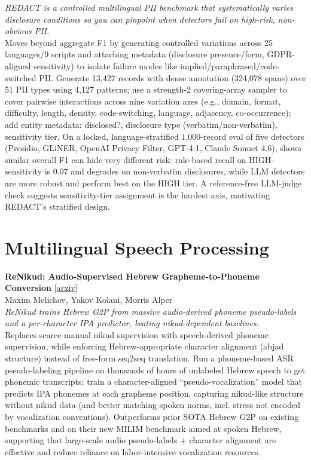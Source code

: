 \documentclass[12pt,letterpaper]{article}
\begin{document}
{\small\textit{REDACT is a controlled multilingual PII benchmark that systematically varies disclosure conditions so you can pinpoint when detectors fail on high-risk, non-obvious PII.}}\\[1pt]
{\footnotesize Moves beyond aggregate F1 by generating controlled variations across 25 languages/9 scripts and attaching metadata (disclosure presence/form, GDPR-aligned sensitivity) to isolate failure modes like implied/paraphrased/code-switched PII. Generate 13,427 records with dense annotation (324,078 spans) over 51 PII types using 4,127 patterns; use a strength-2 covering-array sampler to cover pairwise interactions across nine variation axes (e.g., domain, format, difficulty, length, density, code-switching, language, adjacency, co-occurrence); add entity metadata: disclosed?, disclosure type (verbatim/non-verbatim), sensitivity tier. On a locked, language-stratified 1,000-record eval of five detectors (Presidio, GLiNER, OpenAI Privacy Filter, GPT-4.1, Claude Sonnet 4.6), shows similar overall F1 can hide very different risk: rule-based recall on HIGH-sensitivity is 0.07 and degrades on non-verbatim disclosures, while LLM detectors are more robust and perform best on the HIGH tier. A reference-free LLM-judge check suggests sensitivity-tier assignment is the hardest axis, motivating REDACT's stratified design.}

\medskip


\section*{Multilingual Speech Processing}

{\small\textbf{ReNikud: Audio-Supervised Hebrew Grapheme-to-Phoneme Conversion}} {\scriptsize[\href{https://arxiv.org/abs/2606.20179}{arxiv}]}\\
{\scriptsize Maxim Melichov, Yakov Kolani, Morris Alper}\\

{\small\textit{ReNikud trains Hebrew G2P from massive audio-derived phoneme pseudo-labels and a per-character IPA predictor, beating nikud-dependent baselines.}}\\[1pt]
{\footnotesize Replaces scarce manual nikud supervision with speech-derived phoneme supervision, while enforcing Hebrew-appropriate character alignment (abjad structure) instead of free-form seq2seq translation. Run a phoneme-based ASR pseudo-labeling pipeline on thousands of hours of unlabeled Hebrew speech to get phonemic transcripts; train a character-aligned ``pseudo-vocalization'' model that predicts IPA phonemes at each grapheme position, capturing nikud-like structure without nikud data (and better matching spoken norms, incl. stress not encoded by vocalization conventions). Outperforms prior SOTA Hebrew G2P on existing benchmarks and on their new MILIM benchmark aimed at spoken Hebrew, supporting that large-scale audio pseudo-labels + character alignment are effective and reduce reliance on labor-intensive vocalization resources.}
\end{document}
